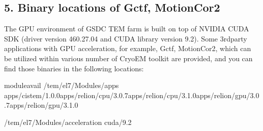 \documentclass[a4paper,10pt,english]{sphinxmanual}
\begin{document}
\subsection{5. Binary locations of Gctf, MotionCor2}
\label{\detokenize{cryoSPARC:binary-locations-of-gctf-motioncor2}}
\sphinxAtStartPar
The GPU environment of GSDC TEM farm is built on top of NVIDIA CUDA SDK (driver version 460.27.04 and CUDA library version 9.2).
Some 3rd\sphinxhyphen{}party applications with GPU acceleration, for example, Gctf, MotionCor2, which can be utilized within various number of Cryo\sphinxhyphen{}EM toolkit are provided, and
you can find those binaries in the following locations:

\begin{sphinxVerbatim}[commandchars=\\\{\}]

\PYGZdl{}\PYGZgt{}moduleavail
\PYGZhy{}\PYGZhy{}\PYGZhy{}\PYGZhy{}\PYGZhy{}\PYGZhy{}\PYGZhy{}\PYGZhy{}\PYGZhy{}\PYGZhy{}\PYGZhy{}\PYGZhy{}\PYGZhy{}\PYGZhy{}\PYGZhy{}\PYGZhy{}\PYGZhy{}\PYGZhy{}\PYGZhy{}\PYGZhy{}\PYGZhy{}\PYGZhy{}\PYGZhy{}\PYGZhy{}\PYGZhy{}\PYGZhy{}\PYGZhy{}\PYGZhy{}\PYGZhy{}\PYGZhy{}\PYGZhy{}\PYGZhy{}\PYGZhy{}\PYGZhy{}\PYGZhy{}\PYGZhy{}\PYGZhy{}\PYGZhy{}\PYGZhy{}\PYGZhy{}\PYGZhy{}\PYGZhy{}\PYGZhy{}\PYGZhy{}\PYGZhy{}\PYGZhy{}\PYGZhy{}\PYGZhy{}/tem/el7/Modules/apps\PYGZhy{}\PYGZhy{}\PYGZhy{}\PYGZhy{}\PYGZhy{}\PYGZhy{}\PYGZhy{}\PYGZhy{}\PYGZhy{}\PYGZhy{}\PYGZhy{}\PYGZhy{}\PYGZhy{}\PYGZhy{}\PYGZhy{}\PYGZhy{}\PYGZhy{}\PYGZhy{}\PYGZhy{}\PYGZhy{}\PYGZhy{}\PYGZhy{}\PYGZhy{}\PYGZhy{}\PYGZhy{}\PYGZhy{}\PYGZhy{}\PYGZhy{}\PYGZhy{}\PYGZhy{}\PYGZhy{}\PYGZhy{}\PYGZhy{}\PYGZhy{}\PYGZhy{}\PYGZhy{}\PYGZhy{}\PYGZhy{}\PYGZhy{}\PYGZhy{}\PYGZhy{}\PYGZhy{}\PYGZhy{}\PYGZhy{}\PYGZhy{}\PYGZhy{}\PYGZhy{}\PYGZhy{}
apps/cistem/1.0.0apps/relion/cpu/3.0.7apps/relion/cpu/3.1.0apps/relion/gpu/3.0.7apps/relion/gpu/3.1.0

\PYGZhy{}\PYGZhy{}\PYGZhy{}\PYGZhy{}\PYGZhy{}\PYGZhy{}\PYGZhy{}\PYGZhy{}\PYGZhy{}\PYGZhy{}\PYGZhy{}\PYGZhy{}\PYGZhy{}\PYGZhy{}\PYGZhy{}\PYGZhy{}\PYGZhy{}\PYGZhy{}\PYGZhy{}\PYGZhy{}\PYGZhy{}\PYGZhy{}\PYGZhy{}\PYGZhy{}\PYGZhy{}\PYGZhy{}\PYGZhy{}\PYGZhy{}\PYGZhy{}\PYGZhy{}\PYGZhy{}\PYGZhy{}\PYGZhy{}\PYGZhy{}\PYGZhy{}\PYGZhy{}\PYGZhy{}\PYGZhy{}\PYGZhy{}\PYGZhy{}\PYGZhy{}\PYGZhy{}\PYGZhy{}\PYGZhy{}/tem/el7/Modules/acceleration\PYGZhy{}\PYGZhy{}\PYGZhy{}\PYGZhy{}\PYGZhy{}\PYGZhy{}\PYGZhy{}\PYGZhy{}\PYGZhy{}\PYGZhy{}\PYGZhy{}\PYGZhy{}\PYGZhy{}\PYGZhy{}\PYGZhy{}\PYGZhy{}\PYGZhy{}\PYGZhy{}\PYGZhy{}\PYGZhy{}\PYGZhy{}\PYGZhy{}\PYGZhy{}\PYGZhy{}\PYGZhy{}\PYGZhy{}\PYGZhy{}\PYGZhy{}\PYGZhy{}\PYGZhy{}\PYGZhy{}\PYGZhy{}\PYGZhy{}\PYGZhy{}\PYGZhy{}\PYGZhy{}\PYGZhy{}\PYGZhy{}\PYGZhy{}\PYGZhy{}\PYGZhy{}\PYGZhy{}\PYGZhy{}\PYGZhy{}
cuda/9.2


\end{sphinxVerbatim}
\end{document}
